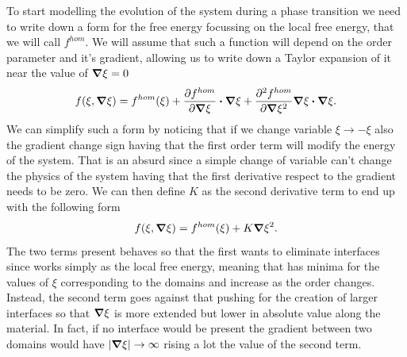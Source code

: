 To start modelling the evolution of the system during a phase transition we need to write down a form for the free energy focussing on the local free energy, that we will call $f^{hom}$. We will assume that such a function will depend on the order parameter and it's gradient, allowing us to write down a Taylor expansion of it near the value of $\grad \xi = 0$
\begin{equation}
    f(\xi, \grad\xi) = f^{hom}(\xi) + \pdv{f^{hom}}{\grad \xi}\vdot \grad\xi + \pdv[2] {f^{hom}}{\grad \xi} \grad\xi \vdot \grad \xi.
\end{equation}
We can simplify such a form by noticing that if we change variable $\xi \to -\xi$ also the gradient change sign having that the first order term will modify the energy of the system. That is an absurd since a simple change of variable can't change the physics of the system having that the first derivative respect to the gradient needs to be zero. We can then define $K$ as the second derivative term to end up with the following form
\begin{equation}
    \label{eq:LocalFreeEnerg}
    f(\xi, \grad\xi) = f^{hom}(\xi) + K\grad \xi^2.
\end{equation}
The two terms present behaves so that the first wants to eliminate interfaces since works simply as the local free energy, meaning that has minima for the values of $\xi$ corresponding to the domains and increase as the order changes. Instead, the second term goes against that pushing for the creation of larger interfaces so that $\grad\xi$ is more extended but lower in absolute value along the material. In fact, if no interface would be present the gradient between two domains would have $\abs{\grad\xi} \to \infty$ rising a lot the value of the second term.

